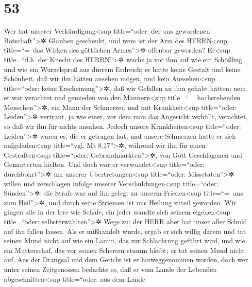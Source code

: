 \hypertarget{section-52}{%
\section{53}\label{section-52}}

Wer hat unserer Verkündigung\textless sup title=``oder:
der uns gewordenen Botschaft''\textgreater✲ Glauben geschenkt, und wem
ist der Arm des HERRN\textless sup title=``=~das Wirken des göttlichen
Armes''\textgreater✲ offenbar geworden? Er\textless sup
title=``d.h. der Knecht des HERRN''\textgreater✲ wuchs ja vor ihm auf
wie ein Schößling und wie ein Wurzelsproß aus dürrem Erdreich; er hatte
keine Gestalt und keine Schönheit, daß wir ihn hätten ansehen mögen, und
kein Aussehen\textless sup title=``oder: keine
Erscheinung''\textgreater✲, daß wir Gefallen an ihm gehabt hätten;
nein, er war verachtet und gemieden von den
Männern\textless sup title=``=~hochstehenden Menschen''\textgreater✲,
ein Mann der Schmerzen und mit Krankheit\textless sup title=``oder:
Leiden''\textgreater✲ vertraut, ja wie einer, vor dem man das Angesicht
verhüllt, verachtet, so daß wir ihn für nichts ansahen.
Jedoch unsere Krankheiten\textless sup title=``oder:
Leiden''\textgreater✲ waren es, die er getragen hat, und unsere
Schmerzen hatte er sich aufgeladen\textless sup title=``vgl. Mt
8,17''\textgreater✲, während wir ihn für einen Gestraften\textless sup
title=``oder: Gebrandmarkten''\textgreater✲, von Gott Geschlagenen und
Gemarterten hielten. Und doch war er
verwundet\textless sup title=``oder: durchbohrt''\textgreater✲ um
unserer Übertretungen\textless sup title=``oder:
Missetaten''\textgreater✲ willen und zerschlagen infolge unserer
Verschuldungen\textless sup title=``oder: Sünden''\textgreater✲: die
Strafe war auf ihn gelegt zu unserm Frieden\textless sup title=``=~uns
zum Heil''\textgreater✲, und durch seine Striemen ist uns Heilung zuteil
geworden. Wir gingen alle in der Irre wie Schafe, ein
jeder wandte sich seinem eigenen\textless sup title=``oder:
selbsterwählten''\textgreater✲ Wege zu; der HERR aber hat unser aller
Schuld auf ihn fallen lassen. Als er mißhandelt wurde,
ergab er sich willig darein und tat seinen Mund nicht auf wie ein Lamm,
das zur Schlachtung geführt wird, und wie ein Mutterschaf, das vor
seinen Scherern stumm bleibt; er tat seinen Mund nicht auf.
Aus der Drangsal und dem Gericht ist er hinweggenommen
worden, doch wer unter seinen Zeitgenossen bedachte es, daß er vom Lande
der Lebenden abgeschnitten\textless sup title=``oder: aus dem Lande
